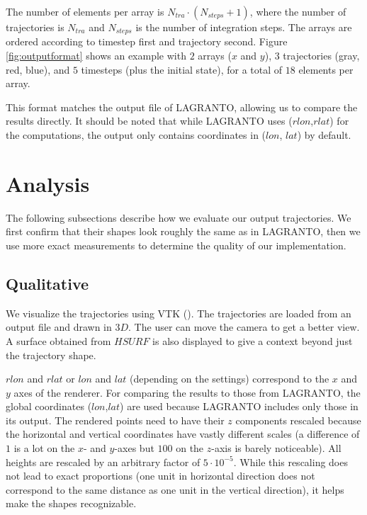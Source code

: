 The number of elements per array is $N_{tra}\cdot(N_{steps}+1)$, where the number of trajectories is $N_{tra}$ and $N_{steps}$ is the number of integration steps. The arrays are ordered according to timestep first and  trajectory second. Figure \ref{fig:outputformat} shows an example with $2$ arrays ($x$ and $y$), $3$ trajectories (gray, red, blue), and $5$ timesteps (plus the initial state), for a total of $18$ elements per array.

This format matches the output file of LAGRANTO, allowing us to compare the results directly. It should be noted that while LAGRANTO uses ($rlon$,$rlat$) for the computations, the output only contains coordinates in ($lon$, $lat$) by default.

\section{Analysis}
The following subsections describe how we evaluate our output trajectories. We first confirm that their shapes look roughly the same as in LAGRANTO, then we use more exact measurements to determine the quality of our implementation.

\subsection{Qualitative}
We visualize the trajectories using VTK (\cite{src:vtk}). The trajectories are loaded from an output file and drawn in $3D$. The user can move the camera to get a better view. A surface obtained from $HSURF$ is also displayed to give a context beyond just the trajectory shape.

$rlon$ and $rlat$ or $lon$ and $lat$ (depending on the settings) correspond to the $x$ and $y$ axes of the renderer. For comparing the results to those from LAGRANTO, the global coordinates ($lon$,$lat$) are used because LAGRANTO includes only those in its output. The rendered points need to have their $z$ components rescaled because the horizontal and vertical coordinates have vastly different scales (a difference of $1$ is a lot on the $x$- and $y$-axes but $100$ on the $z$-axis is barely noticeable). All heights are rescaled by an arbitrary factor of $5\cdot 10^{-5}$. While this rescaling does not lead to exact proportions (one unit in horizontal direction does not correspond to the same distance as one unit in the vertical direction), it helps make the shapes recognizable. %

